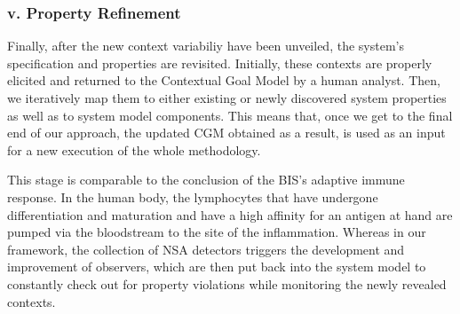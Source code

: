 \subsubsection{v. Property Refinement}

Finally, after the new context variabiliy have been unveiled, the system's specification and properties are revisited. Initially, these contexts are properly elicited and returned to the Contextual Goal Model by a human analyst. Then, we iteratively map them to either existing or newly discovered system properties as well as to system model components. This means that, once we get to the final end of our approach, the updated CGM obtained as a result, is used as an input for a new execution of the whole methodology.

This stage is comparable to the conclusion of the BIS's adaptive immune response. In the human body, the lymphocytes that have undergone differentiation and maturation and have a high affinity for an antigen at hand are pumped via the bloodstream to the site of the inflammation. Whereas in our framework, the collection of NSA detectors triggers the development and improvement of observers, which are then put back into the system model to constantly check out for property violations while monitoring the newly revealed contexts.

